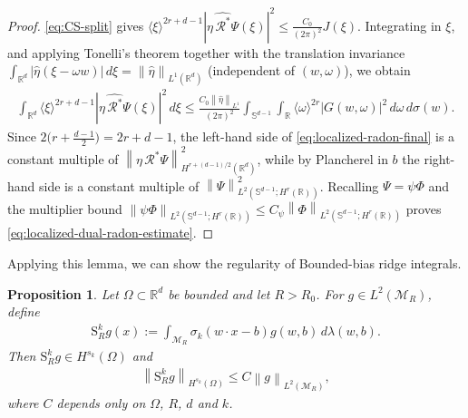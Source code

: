 \documentclass[12pt]{article}
\numberwithin{equation}{section}
\newtheorem{proposition}{Proposition}[section]
\numberwithin{figure}{section}
\numberwithin{equation}{section}
\newcommand{\R}{\mathbb{R}}
\newcommand{\Sph}{\mathbb S}
\newcommand{\MR}{\mathcal M_R}
\newcommand{\norm}[1]{\left\|#1\right\|}
\begin{document}
\begin{proof}
\eqref{eq:CS-split} gives
$\langle\xi\rangle^{2r+d-1}|\widehat{\eta\,\mathcal R^*\Psi}(\xi)|^2
\le\tfrac{C_0}{(2\pi)^2}J(\xi)$. Integrating in $\xi$, and applying Tonelli's
theorem together with the translation invariance
$\int_{\R^d}|\widehat\eta(\xi-\omega w)|\,d\xi=\norm{\widehat\eta}_{L^1(\R^d)}$
(independent of $(w,\omega)$), we obtain
\begin{align}
    \int_{\R^d}\langle\xi\rangle^{2r+d-1}
    |\widehat{\eta\,\mathcal R^*\Psi}(\xi)|^2\,d\xi
    \le\frac{C_0\norm{\widehat\eta}_{L^1}}{(2\pi)^2}
    \int_{\Sph^{d-1}}\int_\R
    \langle\omega\rangle^{2r}|G(w,\omega)|^2\,d\omega\,d\sigma(w).
    \label{eq:localized-radon-final}
\end{align}
Since $2\bigl(r+\tfrac{d-1}2\bigr)=2r+d-1$, the left-hand side of
\eqref{eq:localized-radon-final} is a constant multiple of
$\norm{\eta\,\mathcal R^*\Psi}_{H^{r+(d-1)/2}(\R^d)}^2$, while by Plancherel in $b$
the right-hand side is a constant multiple of
$\norm{\Psi}_{L^2(\Sph^{d-1};H^r(\R))}^2$. Recalling $\Psi=\psi\Phi$ and the
multiplier bound $\norm{\psi\Phi}_{L^2(\Sph^{d-1};H^r(\R))}\le
C_\psi\norm{\Phi}_{L^2(\Sph^{d-1};H^r(\R))}$ proves
\eqref{eq:localized-dual-radon-estimate}.
\end{proof}



Applying this lemma, we can show the regularity of Bounded-bias ridge integrals.
\begin{proposition}
\label{prop:ridge-integral-regularity}
Let $\Omega\subset\R^d$ be bounded and let $R>R_0$. For $g\in L^2(\MR)$, define
\begin{align*}
    \mathrm{S}^k_R g(x)
    :=\int_{\MR}\sigma_k(w\cdot x-b)g(w,b)\,d\lambda(w,b).
\end{align*}
Then $\mathrm{S}^k_R g\in H^{s_k}(\Omega)$ and
\begin{align}
    \norm{\mathrm{S}^k_R g}_{H^{s_k}(\Omega)}
    \le C\norm{g}_{L^2(\MR)},
    \label{eq:AR-regularity}
\end{align}
where $C$ depends only on $\Omega$, $R$, $d$ and $k$.
\end{proposition}
\end{document}
